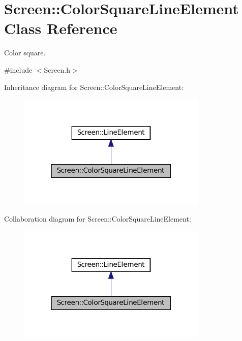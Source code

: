 \hypertarget{classScreen_1_1ColorSquareLineElement}{}\section{Screen\+:\+:Color\+Square\+Line\+Element Class Reference}
\label{classScreen_1_1ColorSquareLineElement}


Color square.  




{\ttfamily \#include $<$Screen.\+h$>$}



Inheritance diagram for Screen\+:\+:Color\+Square\+Line\+Element\+:
\nopagebreak
\begin{figure}[H]
\begin{center}
\leavevmode
\includegraphics[width=256pt]{classScreen_1_1ColorSquareLineElement__inherit__graph}
\end{center}
\end{figure}


Collaboration diagram for Screen\+:\+:Color\+Square\+Line\+Element\+:
\nopagebreak
\begin{figure}[H]
\begin{center}
\leavevmode
\includegraphics[width=256pt]{classScreen_1_1ColorSquareLineElement__coll__graph}
\end{center}
\end{figure}
